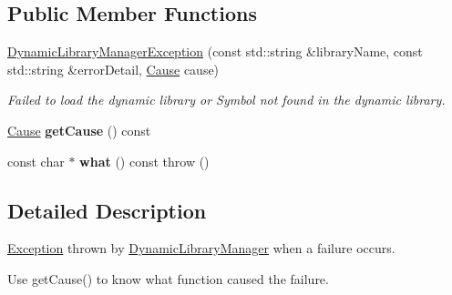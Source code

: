 \subsection*{Public Member Functions}
\begin{DoxyCompactItemize}
\item 
\hypertarget{class_dynamic_library_manager_exception_a15629092a054849f1cb73f8f468f8125}{\hyperlink{class_dynamic_library_manager_exception_a15629092a054849f1cb73f8f468f8125}{Dynamic\-Library\-Manager\-Exception} (const std\-::string \&library\-Name, const std\-::string \&error\-Detail, \hyperlink{class_dynamic_library_manager_exception_a73b4694c152e0693fbc19fb04987a0b9}{Cause} cause)}\label{class_dynamic_library_manager_exception_a15629092a054849f1cb73f8f468f8125}

\begin{DoxyCompactList}\small\item\em Failed to load the dynamic library or Symbol not found in the dynamic library. \end{DoxyCompactList}\item 
\hypertarget{class_dynamic_library_manager_exception_ab389b721f9a45814b8269ba865a1f25f}{\hyperlink{class_dynamic_library_manager_exception_a73b4694c152e0693fbc19fb04987a0b9}{Cause} {\bfseries get\-Cause} () const }\label{class_dynamic_library_manager_exception_ab389b721f9a45814b8269ba865a1f25f}

\item 
\hypertarget{class_dynamic_library_manager_exception_a3e6ed8a5e743a8ac80e4cb73a5d87360}{const char $\ast$ {\bfseries what} () const   throw ()}\label{class_dynamic_library_manager_exception_a3e6ed8a5e743a8ac80e4cb73a5d87360}

\end{DoxyCompactItemize}


\subsection{Detailed Description}
\hyperlink{class_exception}{Exception} thrown by \hyperlink{class_dynamic_library_manager}{Dynamic\-Library\-Manager} when a failure occurs. 

Use get\-Cause() to know what function caused the failure. 

